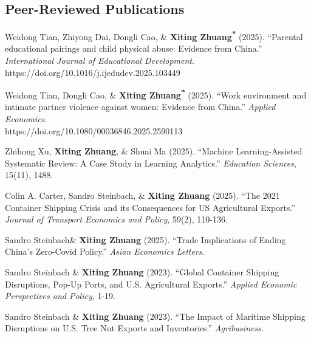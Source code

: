 \documentclass[10.5pt,letterpaper]{article}
\newcommand{\corrauthor}{\textsuperscript{*}}
\renewenvironment{itemize}{
	\begin{list}{}{
			\setlength{\leftmargin}{1.5em}
		}
	}{
	\end{list}
}
\begin{document}
	\subsection*{\textbf{Peer-Reviewed Publications}}
	\begin{itemize}
		
\item[-] Weidong Tian, Zhiyong Dai, Dongli Cao, \& \textbf{Xiting Zhuang\corrauthor} (2025).  
``Parental educational pairings and child physical abuse: Evidence from China.''  
\textit{International Journal of Educational Development}.  \\
https://doi.org/10.1016/j.ijedudev.2025.103449

\item[-] Weidong Tian, Dongli Cao, \& \textbf{Xiting Zhuang\corrauthor} (2025).  
``Work environment and intimate partner violence against women: Evidence from China.''  
\textit{Applied Economics}.\\
https://doi.org/10.1080/00036846.2025.2590113


		
		\item[-] Zhihong Xu, \textbf{Xiting Zhuang}, \& Shuai Ma (2025).  
		``Machine Learning-Assisted Systematic Review: A Case Study in Learning Analytics.''  
		\textit{Education Sciences}, 15(11), 1488.  
		
		\item[-] Colin A. Carter, Sandro Steinbach, \& \textbf{Xiting Zhuang} (2025).  
		``The 2021 Container Shipping Crisis and its Consequences for US Agricultural Exports.''  
		\textit{Journal of Transport Economics and Policy}, 59(2), 110-136.  
		
		
				

		
 
		
		\item[-] Sandro Steinbach\& \textbf{Xiting Zhuang} (2025).  
		``Trade Implications of Ending China’s Zero-Covid Policy.''  
		\textit{Asian Economics Letters}. 
		
		\item[-] Sandro Steinbach \& \textbf{Xiting Zhuang} (2023).  
		``Global Container Shipping Disruptions, Pop-Up Ports, and U.S. Agricultural Exports.''  
		\textit{Applied Economic Perspectives and Policy}, 1-19.
		
		\item[-] Sandro Steinbach  \& \textbf{Xiting Zhuang} (2023).  
		``The Impact of Maritime Shipping Disruptions on U.S. Tree Nut Exports and Inventories.''  
		\textit{Agribusiness}.
		

\end{itemize}
\end{document}
